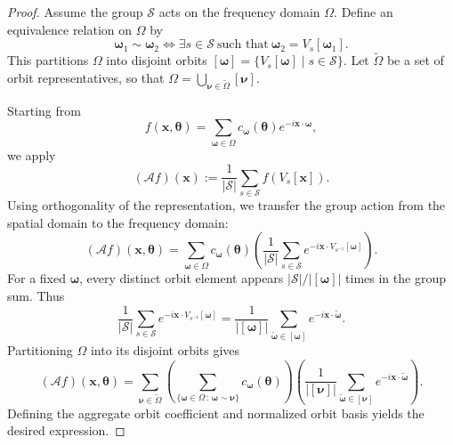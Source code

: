 \documentclass[%
 reprint,
 amsmath,amssymb,
 aps,
 pra,
]{revtex4-2}
\theoremstyle{definition}
\begin{document}
\begin{proof}
Assume the group \(\mathcal{S}\) acts on the frequency domain \(\Omega\). Define an equivalence relation on \(\Omega\) by
\begin{equation}
\bm{\omega}_1 \sim \bm{\omega}_2
\iff
\exists s \in \mathcal{S}\ \text{such that}\ \bm{\omega}_2 = V_s[\bm{\omega}_1].
\end{equation}
This partitions \(\Omega\) into disjoint orbits \([\bm{\omega}] = \{ V_s[\bm{\omega}] \mid s \in \mathcal{S} \}\). Let \(\tilde{\Omega}\) be a set of orbit representatives, so that \(\Omega = \bigcup_{\bm{\nu} \in \tilde{\Omega}} [\bm{\nu}]\).

Starting from
\begin{equation}
f(\bm{x}, \bm{\theta}) = \sum_{\bm{\omega} \in \Omega} c_{\bm{\omega}}(\bm{\theta}) e^{-i \bm{x} \cdot \bm{\omega}},
\end{equation}
we apply
\begin{equation}
(\mathcal{A}f)(\bm{x}) := \frac{1}{|\mathcal{S}|} \sum_{s \in \mathcal{S}} f(V_s[\bm{x}]).
\end{equation}
Using orthogonality of the representation, we transfer the group action from the spatial domain to the frequency domain:
\begin{equation}
(\mathcal{A}f)(\bm{x}, \bm{\theta}) = \sum_{\bm{\omega} \in \Omega} c_{\bm{\omega}}(\bm{\theta}) \left( \frac{1}{|\mathcal{S}|} \sum_{s \in \mathcal{S}} e^{-i \bm{x} \cdot V_{s^{-1}}[\bm{\omega}]} \right).
\end{equation}
For a fixed \(\bm{\omega}\), every distinct orbit element appears \(|\mathcal{S}|/|[\bm{\omega}]|\) times in the group sum. Thus
\begin{equation}
\frac{1}{|\mathcal{S}|}\sum_{s\in\mathcal{S}}e^{-i\bm{x}\cdot V_{s^{-1}}[\bm{\omega}]}
=
\frac{1}{|[\bm{\omega}]|}\sum_{\tilde{\bm{\omega}}\in[\bm{\omega}]}e^{-i\bm{x}\cdot\tilde{\bm{\omega}}}.
\end{equation}
Partitioning \(\Omega\) into its disjoint orbits gives
\begin{equation}
(\mathcal{A}f)(\bm{x}, \bm{\theta}) = \sum_{\bm{\nu} \in \tilde{\Omega}} \left( \sum_{\{\bm{\omega} \in \Omega \,:\, \bm{\omega} \sim \bm{\nu}\}} c_{\bm{\omega}}(\bm{\theta}) \right) \left( \frac{1}{|[\bm{\nu}]|} \sum_{\tilde{\bm{\omega}} \in [\bm{\nu}]} e^{-i \bm{x} \cdot \tilde{\bm{\omega}}} \right).
\end{equation}
Defining the aggregate orbit coefficient and normalized orbit basis yields the desired expression.
\end{proof}
\end{document}

